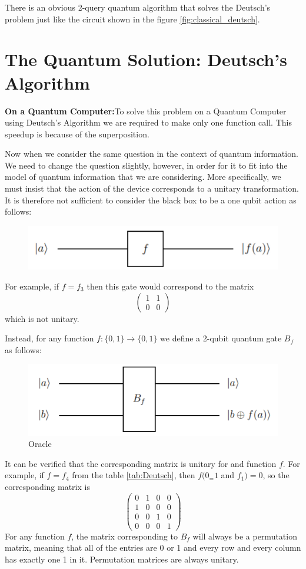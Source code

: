 \documentclass[12pt, oneside]{book}
\theoremstyle{definition}
\theoremstyle{definition}
\theoremstyle{remark}
\begin{document}
There is an obvious 2-query quantum algorithm that solves the Deutsch's problem just like the circuit shown in the figure \ref{fig:classical_deutsch}.
\section{The Quantum Solution: Deutsch's Algorithm}
\textbf{On a Quantum Computer:}To solve this problem on a Quantum Computer using Deutsch's Algorithm we are required to make only one function call. This speedup is because of the superposition.

Now when we consider the same question in the context of quantum information. We need to change the question slightly, however, in order for it to fit into the model of quantum information that we are considering. More specifically, we must insist that the action of the device corresponds to a unitary transformation. It is therefore not sufficient to consider the black box to be a one qubit action as follows:
\begin{figure}[H]
    \centering
    \includegraphics[width=1\linewidth]{../images/Deutsch_bb.png}
    \label{fig:enter-label}
\end{figure}
For example, if $f=f_3$ then this gate would correspond to the matrix
\[
\begin{pmatrix} 1 & 1 \\ 0 & 0 \end{pmatrix}
\]
which is not unitary.

Instead, for any function $f:\{0,1\}\rightarrow\{0,1\}$ we define a 2-qubit quantum gate $B_f$ as follows:
\begin{figure}[H]
    \centering
    \includegraphics[width=1\linewidth]{../images/deutsch_oracle.png}
    \caption{Oracle}
    \label{fig:deutsch_oracle}
\end{figure}
It can be verified that the corresponding matrix is unitary for and function $f$. For example, if $f=f_4$ from the table \ref{tab:Deutsch}, then $f(0_=1$ and $f_1)=0$, so the corresponding matrix is
\[
\begin{pmatrix} 0 & 1 & 0 & 0 \\1 & 0 & 0 & 0\\ 0 & 0 & 1 & 0 \\ 0 & 0 & 0 & 1 \end{pmatrix}
\]
For any function $f$, the matrix corresponding to $B_f$ will always be a permutation matrix, meaning that all of the entries are 0 or 1 and every row and every column has exactly one 1 in it. Permutation matrices are always unitary.
\end{document}
